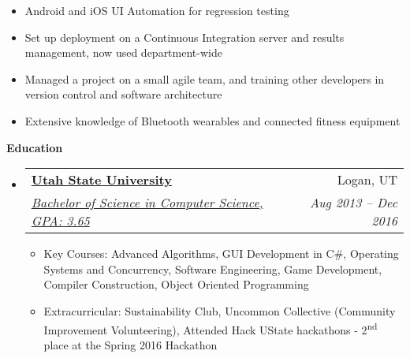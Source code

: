 \documentclass[letterpaper,11pt]{article}
\makeatletter
\newcommand{\resitem}[1]{\item #1 \vspace{-2pt}}
\newcommand{\resheading}[1]{{\large \colorbox{mygrey}{\begin{minipage}{\textwidth}{\textbf{#1 \vphantom{p\^{E}}}}\end{minipage}}}}
\newcommand{\ressubheading}[4]{
\begin{tabular*}{6.5in}{l@{\extracolsep{\fill}}r}
		\textbf{#1} & #2 \\
		\textit{#3} & \textit{#4} \\
\end{tabular*}\vspace{-6pt}}
\makeatother
\begin{document}
\begin{itemize}
				{ \footnotesize
				\begin{itemize}
					\resitem{Android and iOS UI Automation for regression testing}
					\resitem{Set up deployment on a Continuous Integration server and results management, now used department-wide}
					\resitem{Managed a project on a small agile team, and training other developers in version control and software architecture}
					\resitem{Extensive knowledge of Bluetooth wearables and connected fitness equipment}
				\end{itemize}
				}

	\end{itemize}  %


\resheading{Education}
	\begin{itemize}
		\item
			\ressubheading{\href{http://www.usu.edu}{Utah State University}}{Logan, UT}{\href{http://www.cs.usu.edu}{Bachelor of Science in Computer Science, GPA: 3.65}}{Aug 2013 -- Dec 2016}
				{ \footnotesize
				\begin{itemize}
					\resitem{Key Courses: Advanced Algorithms, GUI Development in C\#, Operating Systems and Concurrency, Software Engineering, Game Development, Compiler Construction, Object Oriented Programming}
					\resitem{Extracurricular: Sustainability Club, Uncommon Collective (Community Improvement Volunteering), Attended Hack UState hackathons - 2\textsuperscript{nd} place at the Spring 2016 Hackathon}
				\end{itemize}
				}
	\end{itemize} %
\end{document}
